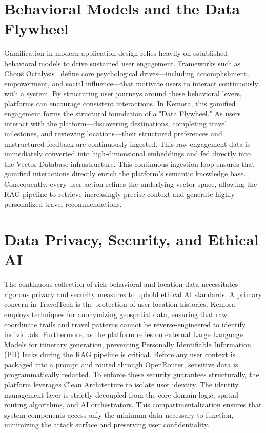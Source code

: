 \section{Behavioral Models and the Data Flywheel}
Gamification in modern application design relies heavily on established behavioral models to drive sustained user engagement. Frameworks such as Chou\'s Octalysis~\cite{chou2015actionable} define core psychological drives—including accomplishment, empowerment, and social influence—that motivate users to interact continuously with a system. By structuring user journeys around these behavioral levers, platforms can encourage consistent interactions. In Kemora, this gamified engagement forms the structural foundation of a "Data Flywheel." As users interact with the platform—discovering destinations, completing travel milestones, and reviewing locations—their structured preferences and unstructured feedback are continuously ingested. This raw engagement data is immediately converted into high-dimensional embeddings and fed directly into the Vector Database infrastructure. This continuous ingestion loop ensures that gamified interactions directly enrich the platform's semantic knowledge base. Consequently, every user action refines the underlying vector space, allowing the RAG pipeline to retrieve increasingly precise context and generate highly personalized travel recommendations.

\section{Data Privacy, Security, and Ethical AI}
The continuous collection of rich behavioral and location data necessitates rigorous privacy and security measures to uphold ethical AI standards. A primary concern in TravelTech is the protection of user location histories. Kemora employs techniques for anonymizing geospatial data, ensuring that raw coordinate trails and travel patterns cannot be reverse-engineered to identify individuals. Furthermore, as the platform relies on external Large Language Models for itinerary generation, preventing Personally Identifiable Information (PII) leaks during the RAG pipeline is critical. Before any user context is packaged into a prompt and routed through OpenRouter, sensitive data is programmatically redacted. To enforce these security guarantees structurally, the platform leverages Clean Architecture to isolate user identity. The identity management layer is strictly decoupled from the core domain logic, spatial routing algorithms, and AI orchestrators. This compartmentalization ensures that system components access only the minimum data necessary to function, minimizing the attack surface and preserving user confidentiality.

